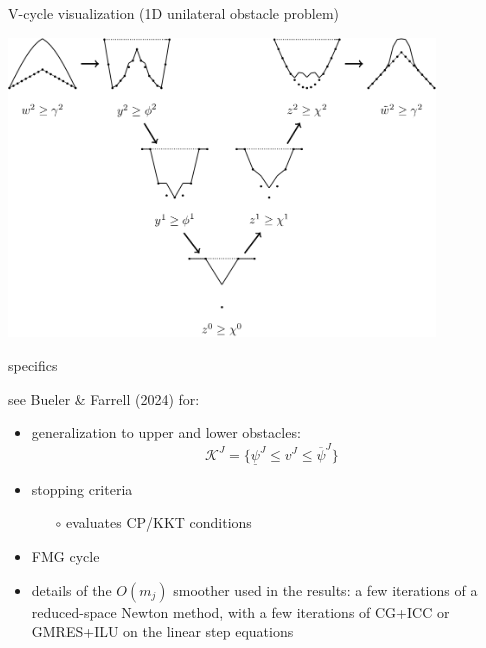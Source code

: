 \documentclass[svgnames,
               hyperref={colorlinks,citecolor=DeepPink4,linkcolor=FireBrick,urlcolor=Maroon},
               usepdftitle=false]  %
               {beamer}
\begin{document}
\begin{frame}{V-cycle visualization (1D unilateral obstacle problem)}

\centering
\includegraphics[width=0.85\textwidth]{../talk-dms/figs/vcycle-visualized.png}
\end{frame}


\begin{frame}{specifics}

see Bueler \& Farrell (2024) for:
\begin{itemize}
\item generalization to upper and lower obstacles:
    $$\mathcal{K}^J = \{\underline{\psi}^J \le v^J \le \overline{\psi}^J\}$$
\item stopping criteria
    \begin{itemize}
    \item[$\circ$] evaluates CP/KKT conditions
    \end{itemize}
\item FMG cycle
\item details of the $O(m_j)$ smoother used in the results: a few iterations of a reduced-space Newton method, with a few iterations of CG+ICC or GMRES+ILU on the linear step equations
\end{itemize}
\end{frame}
\end{document}
